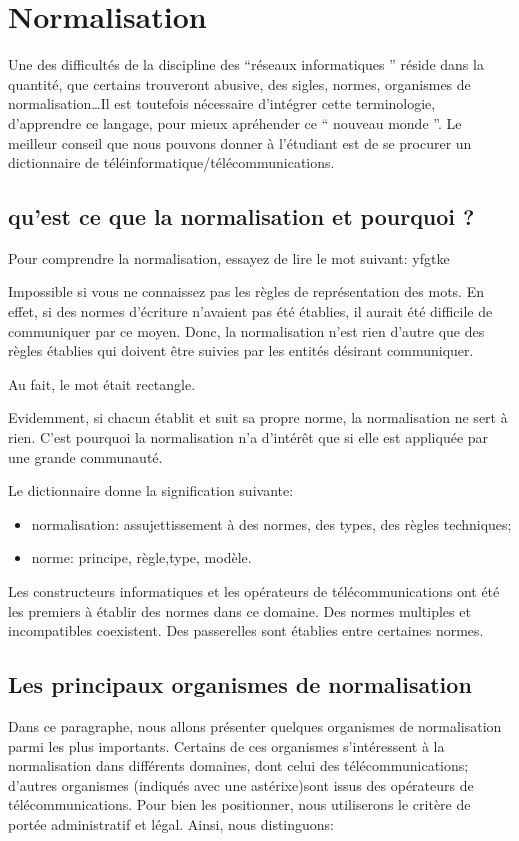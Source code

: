 \chapter{Normalisation}

Une des difficultés de la discipline des ``réseaux informatiques '' réside dans la quantité, que certains trouveront abusive, des sigles, normes, organismes de normalisation\ldots Il est toutefois nécessaire d'intégrer cette terminologie, d'apprendre ce langage, pour mieux apréhender ce `` nouveau monde ''. Le meilleur conseil que nous pouvons donner à l'étudiant est de se procurer un dictionnaire de téléinformatique/télécommunications.

\section{qu'est ce que la normalisation et pourquoi ?}

Pour comprendre la normalisation, essayez de lire le mot suivant: yfgtke

Impossible si vous ne connaissez pas les règles de représentation des mots. En effet, si des normes d'écriture n'avaient pas été établies, il aurait été difficile de communiquer par ce moyen. Donc, la normalisation n'est rien d'autre que des règles établies qui doivent être suivies par les entités désirant communiquer.

Au fait, le mot était rectangle.

Evidemment, si chacun établit et suit sa propre norme, la normalisation ne sert à rien. C'est pourquoi la normalisation n'a d'intérêt que si elle est appliquée par une grande communauté.

Le dictionnaire donne la signification suivante:

\begin{itemize}
	\item normalisation: assujettissement à des normes, des types, des règles techniques;
	\item norme: principe, règle,type, modèle.
\end{itemize}

Les constructeurs informatiques et les opérateurs de télécommunications ont été les premiers à établir des normes dans ce domaine. Des normes multiples et incompatibles coexistent. Des passerelles sont établies entre certaines normes.

\section{Les principaux organismes de normalisation}
Dans ce paragraphe, nous allons présenter quelques organismes de normalisation parmi les plus importants. Certains de ces organismes s'intéressent à la normalisation dans différents domaines, dont celui des télécommunications; d'autres organismes (indiqués avec une astérixe)sont issus des opérateurs de télécommunications. Pour bien les positionner, nous utiliserons le critère de portée administratif et légal. Ainsi, nous distinguons:

